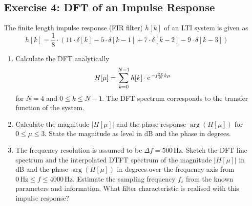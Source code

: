 \documentclass[11pt,a4paper,DIV=12]{scrartcl}
\begin{document}
\subsection*{Exercise 4: DFT of an Impulse Response}
The finite length impulse response (FIR filter) $h[k]$ of an LTI system is given
as
%
\begin{equation}
h[k]=\frac{1}{8}\cdot\left(11\cdot\delta[k]-5\cdot\delta[k-1]+7\cdot\delta[k-2]-9\cdot\delta[k-3]\right)
\end{equation}
%
\begin{enumerate}[label=\alph*)]
	\item Calculate the DFT analytically
%
	\begin{equation}
	H[\mu]=\sum_{k=0}^{N-1}h[k]\cdot\e^{-\im\frac{2\pi}{N}k\mu}
	\end{equation}
	for $N=4$ and $0\leq k\leq N-1$.
	The DFT spectrum corresponds to the transfer function of the system.
%
	\item Calculate the magnitude $|H[\mu]|$ and the phase response $\arg(H[\mu])$
	for $0\leq\mu\leq 3$. State the magnitude as level in dB and the phase in
	degrees.
%
	\item The frequency resolution is assumed to be $\Delta f=500\,\text{Hz}$.
	Sketch the DFT line spectrum and the interpolated DTFT spectrum of the
	magnitude $|H[\mu]|$ in dB and the phase $\arg(H[\mu])$ in degrees over the
	frequency axis from $0\,\text{Hz}\leq f\leq4000\,\text{Hz}$.
	Estimate the sampling frequency $f_s$ from the known parameters and information.
	What filter characteristic is realised with this impulse response?
\end{enumerate}
\end{document}
